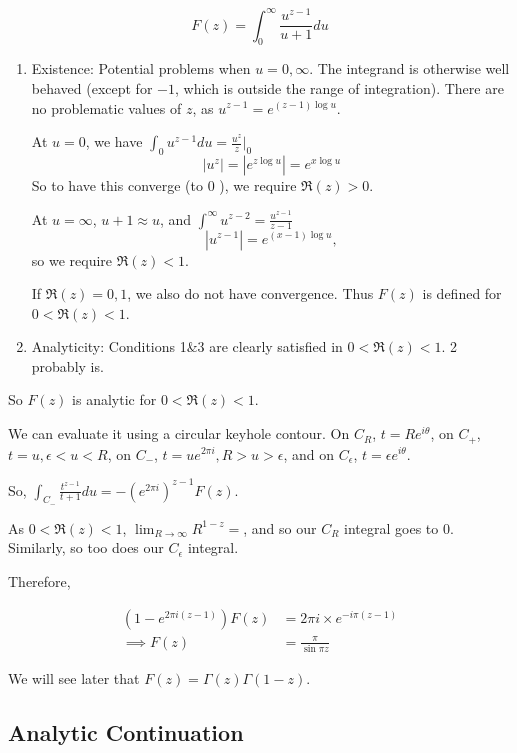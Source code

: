 \documentclass[a4paper]{article}
\begin{document}
\begin{eg}
	\[
		F(z) = \int_{0}^{\infty} \frac{u^{z-1}}{u+1} du
	\]

	\begin{enumerate}
		\item Existence: Potential problems when $u=0,\infty$. The integrand is otherwise well behaved (except for $-1$, which is outside the range of integration). There are no problematic values of $z$, as  $u^{z-1} = e^{(z-1)\log u}$.

		At $u=0$, we have  $\int_{0} u^{z-1} du = \frac{u^{z}}{z} \big\rvert_{0}$
		\[
		|u^{z}| = |e^{z\log u}| = e^{x\log u}
		\]
		So to have this converge (to  $0$ ), we require $\Re(z) >  0$. 

		At $u = \infty$, $u+1 \approx u$, and  $\int ^{\infty} u^{z-2} = \frac{u^{z-1}}{z-1}$
		\[
			|u^{z-1}| = e^{(x-1)\log u}
		,\] so we require $\Re(z) < 1$.

		If $\Re(z) = 0,1$, we also do not have convergence.
		Thus  $F(z)$ is defined for $0<\Re(z) < 1$.

	\item Analyticity: Conditions 1&3 are clearly satisfied in $0<\Re (z) < 1$. 2 probably is.
	\end{enumerate}

	So $F(z)$ is analytic for $0 < \Re(z) < 1$.

	We can evaluate it using a circular keyhole contour. On $C_R$,  $t = Re^{i\theta}$, on $C_{+}$, $ t = u, \epsilon < u < R $, on $C_{-}$, $t = ue^{2\pi i}, R > u > \epsilon$, and on $C_{\epsilon}$, $t = \epsilon e^{i\theta}$.
	
	So, $\int_{C_{-}} \frac{t^{z-1}}{t+1} du = -(e^{2\pi i})^{z-1} F(z)$.

	As $0 < \Re(z) < 1$, $\lim_{R\to \infty} R^{1-z} = $, and so our  $C_R$ integral goes to $0$.
	Similarly, so too does our  $C_{\epsilon}$ integral.

	Therefore,

	\begin{align*}
		(1-e^{2\pi i(z-1)})F(z) &= 2\pi i \times e^{-i \pi (z-1)} \\
		\implies F(z) &=  \frac{\pi}{\sin \pi z }
	\end{align*} 

	We will see later that $F(z) = \Gamma(z) \Gamma(1-z)$.
\end{eg}

\subsection{Analytic Continuation}
\end{document}
